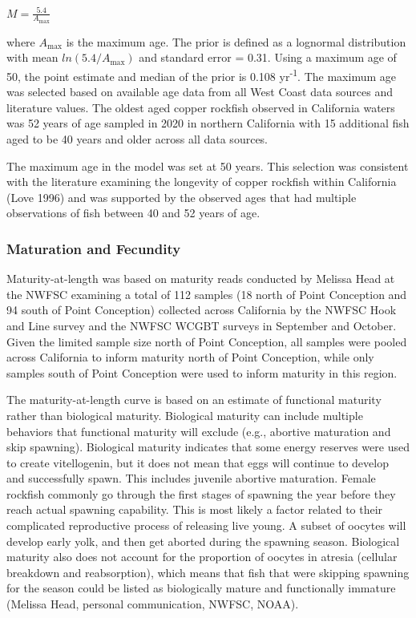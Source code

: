 \documentclass[11pt,
  english,
  letterpaper,
]{article}
\begin{document}
\begin{centering}

$M=\frac{5.4}{A_{\text{max}}}$

\end{centering}

\vspace{0.5cm}

where \(A_{\text{max}}\) is the maximum age. The prior is defined as a lognormal distribution with mean \(ln(5.4/A_{\text{max}})\) and standard error = 0.31. Using a maximum age of 50, the point estimate and median of the prior is 0.108 yr\textsuperscript{-1}. The maximum age was selected based on available age data from all West Coast data sources and literature values. The oldest aged copper rockfish observed in California waters was 52 years of age sampled in 2020 in northern California with 15 additional fish aged to be 40 years and older across all data sources.

The maximum age in the model was set at 50 years. This selection was consistent with the literature examining the longevity of copper rockfish within California (Love 1996) and was supported by the observed ages that had multiple observations of fish between 40 and 52 years of age.

\hypertarget{maturation-and-fecundity}{%
\subsubsection{Maturation and Fecundity}\label{maturation-and-fecundity}}

Maturity-at-length was based on maturity reads conducted by Melissa Head at the NWFSC examining a total of 112 samples (18 north of Point Conception and 94 south of Point Conception) collected across California by the NWFSC Hook and Line survey and the NWFSC WCGBT surveys in September and October. Given the limited sample size north of Point Conception, all samples were pooled across California to inform maturity north of Point Conception, while only samples south of Point Conception were used to inform maturity in this region.

The maturity-at-length curve is based on an estimate of functional maturity rather than biological maturity. Biological maturity can include multiple behaviors that functional maturity will exclude (e.g., abortive maturation and skip spawning). Biological maturity indicates that some energy reserves were used to create vitellogenin, but it does not mean that eggs will continue to develop and successfully spawn. This includes juvenile abortive maturation. Female rockfish commonly go through the first stages of spawning the year before they reach actual spawning capability. This is most likely a factor related to their complicated reproductive process of releasing live young. A subset of oocytes will develop early yolk, and then get aborted during the spawning season. Biological maturity also does not account for the proportion of oocytes in atresia (cellular breakdown and reabsorption), which means that fish that were skipping spawning for the season could be listed as biologically mature and functionally immature (Melissa Head, personal communication, NWFSC, NOAA).
\end{document}
